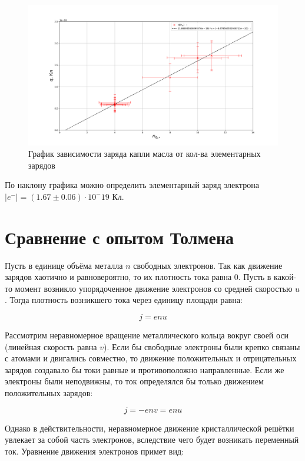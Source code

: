 \documentclass{lab}
\begin{document}
\begin{figure}[H]
	\centering
	\includegraphics[width=\textwidth]{graph.png}
	\caption{График зависимости заряда капли масла от кол-ва элементарных зарядов}
	\label{graph:q_n}
\end{figure}

По наклону графика можно определить элементарный заряд электрона $|e^{-}| = (1.67 \pm 0.06) \cdot 10^-19$ Кл.

\section{Сравнение с опытом Толмена}

Пусть в единице объёма металла $n$ свободных электронов. Так как движение зарядов хаотично и равновероятно, то их плотность тока равна 0. Пусть в какой-то момент возникло упорядоченное движение электронов со средней скоростью $u$. Тогда плотность возникшего тока через единицу площади равна:

\begin{equation}
	j = enu
\end{equation}

Рассмотрим неравномерное вращение металлического кольца вокруг своей оси (линейная скорость равна $v$). Если бы свободные электроны были крепко связаны с атомами и двигались совместно, то движение положительных и отрицательных зарядов создавало бы токи равные и противоположно направленные. Если же электроны были неподвижны, то ток определялся бы только движением положительных зарядов:

\begin{equation}
	j = -env = enu
\end{equation}

Однако в действительности, неравномерное движение кристаллической решётки увлекает за собой часть электронов, вследствие чего будет возникать переменный ток.
Уравнение движения электронов примет вид:
\end{document}

